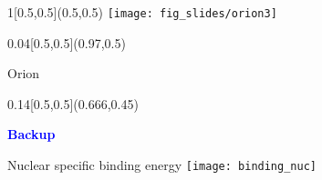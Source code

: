 \documentclass[xcolor=dvipsnames,professionalfonts, aspectratio=169]{beamer}
\begin{document}
\begin{frame}[plain]
  \begin{textblock}{1}[0.5,0.5](0.5,0.5)
    \centering
    \texttt{[image: fig\_slides/orion3]}
  \end{textblock}



  \begin{textblock}{0.04}[0.5,0.5](0.97,0.5)
      \begin{block}{}
            \begin{sideways}
              \color{Blue}
              \centering
              \Large Orion
            \end{sideways}
          \end{block}
  \end{textblock}
\end{frame}
\egroup




\appendix

\bgroup
{}
\begin{frame}[plain]%
  \begin{textblock}{0.14}[0.5,0.5](0.666,0.45)
    \begin{block}{}
      \centering
      \textcolor{Blue}{\Large \bf Backup}
    \end{block}
  \end{textblock}
\end{frame}
\egroup


\begin{frame}{Nuclear specific binding energy}
  \centering
  \texttt{[image: binding\_nuc]}
\end{frame}
\end{document}
